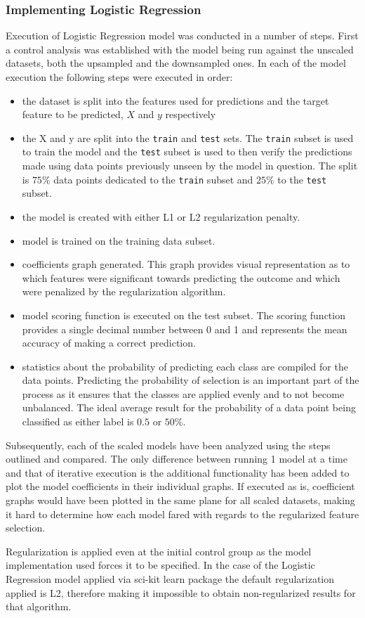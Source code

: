 \subsubsection{Implementing Logistic Regression}\label{sec:exec:log-reg}

Execution of Logistic Regression model was conducted in a number of steps. First a control analysis was established with the model being run against the unscaled datasets, both the upsampled and the downsampled ones. In each of the model execution the following steps were executed in order:
\begin{itemize}
    \item the dataset is split into the features used for predictions and the target feature to be predicted, $X$ and $y$ respectively
    \item the X  and y are split into the \texttt{train} and \texttt{test} sets. The \texttt{train} subset is used to train the model and the \texttt{test} subset is used to then verify the predictions made using data points previously unseen by the model in question. The split is $75\%$ data points dedicated to the \texttt{train} subset and $25\%$ to the \texttt{test} subset.
    \item the model is created with either L1 or L2 regularization penalty.
    \item model is trained on the training data subset.
    \item coefficients graph generated. This graph provides visual representation as to which features were significant towards predicting the outcome and which were penalized by the regularization algorithm.
    \item model scoring function is executed on the test subset. The scoring function provides a single decimal number between 0 and 1 and represents the mean accuracy of making a correct prediction. 
    \item statistics about the probability of predicting each class are compiled for the data points. Predicting the probability of selection is an important part of the process as it ensures that the classes are applied evenly and to not become unbalanced. The ideal average result for the probability of a data point being classified as either label is $0.5$ or $50\%$.
\end{itemize}

Subsequently, each of the scaled models have been analyzed using the steps outlined and compared. The only difference between running 1 model at a time and that of iterative execution is the additional functionality has been added to plot the model coefficients in their individual graphs. If executed as is, coefficient graphs would have been plotted in the same plane for all scaled datasets, making it hard to determine how each model fared with regards to the regularized feature selection. 

Regularization is applied even at the initial control group as the model implementation used forces it to be specified. In the case of the Logistic Regression model applied via sci-kit learn package the default regularization applied is L2, therefore making it impossible to obtain non-regularized results for that algorithm.


